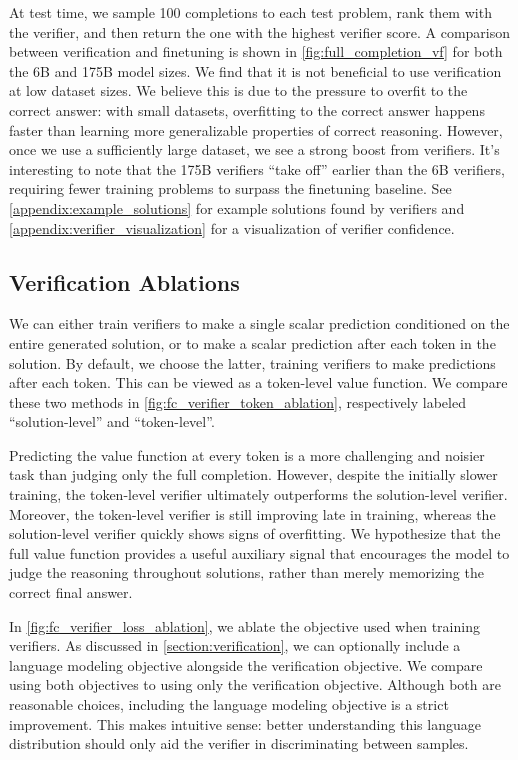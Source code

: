 At test time, we sample 100 completions to each test problem, rank them with the verifier, and then return the one with the highest verifier score. A comparison between verification and finetuning is shown in \ref{fig:full_completion_vf} for both the 6B and 175B model sizes. We find that it is not beneficial to use verification at low dataset sizes. We believe this is due to the pressure to overfit to the correct answer: with small datasets, overfitting to the correct answer happens faster than learning more generalizable properties of correct reasoning. However, once we use a sufficiently large dataset, we see a strong boost from verifiers. It’s interesting to note that the 175B verifiers “take off” earlier than the 6B verifiers, requiring fewer training problems to surpass the finetuning baseline. See \ref{appendix:example_solutions} for example solutions found by verifiers and \ref{appendix:verifier_visualization} for a visualization of verifier confidence. 

\subsection{Verification Ablations} \label{section:verifier_ablations}

We can either train verifiers to make a single scalar prediction conditioned on the entire generated solution, or to make a scalar prediction after each token in the solution. By default, we choose the latter, training verifiers to make predictions after each token. This can be viewed as a token-level value function. We compare these two methods in \ref{fig:fc_verifier_token_ablation}, respectively labeled “solution-level” and “token-level”.

Predicting the value function at every token is a more challenging and noisier task than judging only the full completion. However, despite the initially slower training, the token-level verifier ultimately outperforms the solution-level verifier. Moreover, the token-level verifier is still improving late in training, whereas the solution-level verifier quickly shows signs of overfitting. We hypothesize that the full value function provides a useful auxiliary signal that encourages the model to judge the reasoning throughout solutions, rather than merely memorizing the correct final answer. 

In \ref{fig:fc_verifier_loss_ablation}, we ablate the objective used when training verifiers. As discussed in \ref{section:verification}, we can optionally include a language modeling objective alongside the verification objective. We compare using both objectives to using only the verification objective. Although both are reasonable choices, including the language modeling objective is a strict improvement. This makes intuitive sense: better understanding this language distribution should only aid the verifier in discriminating between samples.

